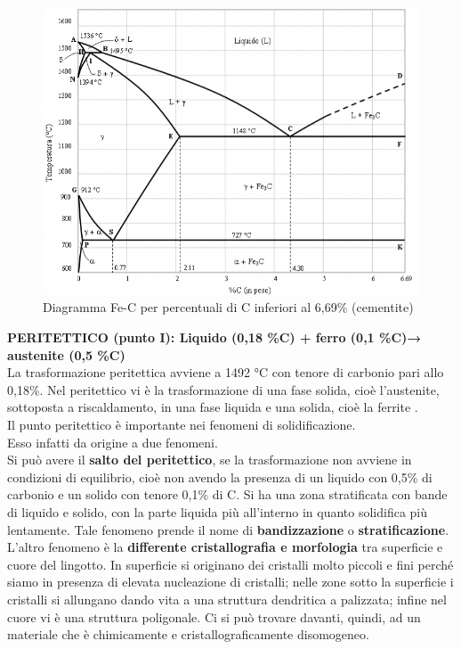 \begin{figure}[h]
\centering
    \includegraphics[width=1\textwidth]{images/img31.png}
    \caption{Diagramma Fe-C per percentuali di C inferiori al 6,69\% (cementite)}
\end{figure}
\textbf{PERITETTICO (punto I): Liquido (0,18 \%C) + ferro \mathtext{\boldsymbol\delta} (0,1 \%C)→ austenite \mathtext{\boldsymbol\gamma} (0,5 \%C)}\\
La trasformazione peritettica avviene a 1492 °C con tenore di carbonio pari allo 0,18\%. Nel peritettico vi è la trasformazione di una fase solida, cioè l’austenite, sottoposta a riscaldamento, in una fase liquida e una solida, cioè la ferrite \mathtext{\delta}.\\
Il punto peritettico è importante nei fenomeni di solidificazione.\\
Esso infatti da origine a due fenomeni.\\
Si può avere il \textbf{salto del peritettico}, se la trasformazione non avviene in condizioni di equilibrio, cioè non avendo la presenza di un liquido con 0,5\% di carbonio e un solido con tenore 0,1\% di C. Si ha una zona stratificata con bande di liquido e solido, con la parte liquida più all’interno in quanto solidifica più lentamente. Tale fenomeno prende il nome di \textbf{bandizzazione} o \textbf{stratificazione}.
L’altro fenomeno è la \textbf{differente cristallografia e morfologia} tra superficie e cuore del lingotto. In superficie si originano dei cristalli molto piccoli e fini perché siamo in presenza di elevata nucleazione di cristalli; nelle zone sotto la superficie i cristalli si allungano dando vita a una struttura dendritica a palizzata; infine nel cuore vi è una struttura poligonale. Ci si può trovare davanti, quindi, ad un materiale che è chimicamente e cristallograficamente disomogeneo.\\
